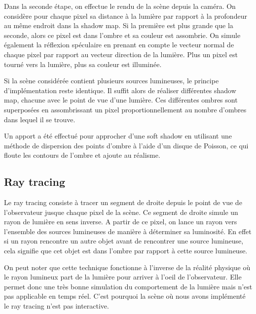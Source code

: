 \documentclass[a4paper,10pt]{report}
\begin{document}
Dans la seconde étape, on effectue le rendu de la scène depuis la caméra. On considère pour chaque pixel sa distance à la lumière par rapport à la profondeur au même endroit dans la shadow map. Si la première est plus grande que la seconde, alors ce pixel est dans l'ombre et sa couleur est assombrie.
On simule également la réflexion spéculaire en prenant en compte le vecteur normal de chaque pixel par rapport au vecteur direction de la lumière. Plus un pixel est tourné vers la lumière, plus sa couleur est illuminée.

Si la scène considérée contient plusieurs sources lumineuses, le principe d'implémentation reste identique. Il suffit alors de réaliser différentes shadow map, chacune avec le point de vue d'une lumière. Ces différentes ombres sont superposées en assombrissant un pixel proportionnellement au nombre d'ombres dans lequel il se trouve.

Un apport a été effectué pour approcher d'une soft shadow en utilisant une méthode de dispersion des points d'ombre à l'aide d'un disque de Poisson, ce qui floute les contours de l'ombre et ajoute au réalisme.


\subsection{Ray tracing}	

Le ray tracing consiste à tracer un segment de droite depuis le point de vue de l'observateur jusque chaque pixel de la scène. Ce segment de droite simule un rayon de lumière en sens inverse. A partir de ce pixel, on lance un rayon vers l'ensemble des sources lumineuses de manière à déterminer sa luminosité. En effet si un rayon rencontre un autre objet avant de rencontrer une source lumineuse, cela signifie que cet objet est dans l'ombre par rapport à cette source lumineuse.

On peut noter que cette technique fonctionne à l'inverse de la réalité physique où le rayon lumineux part de la lumière pour arriver à l'oeil de l'observateur. Elle permet donc une très bonne simulation du comportement de la lumière mais n'est pas applicable en temps réel. C'est pourquoi la scène où nous avons implémenté le ray tracing n'est pas interactive.
\end{document}
